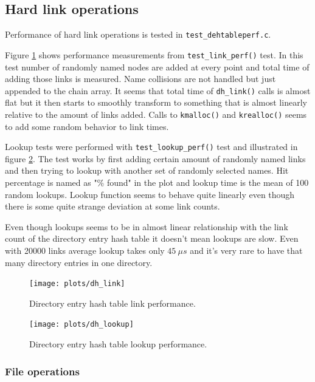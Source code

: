 \subsection{Hard link operations}

Performance of hard link operations is tested in \verb+test_dehtableperf.c+.

Figure \ref{figure:dhlink_perf} shows performance measurements from
\verb+test_link_perf()+ test. In this test number of randomly named nodes are
added at every point and total time of adding those links is measured.
Name collisions are not handled but just appended to the chain array.
It seems that total time of \verb+dh_link()+ calls is almost flat but
it then starts to smoothly transform to something that is almost linearly
relative to the amount of links added. Calls to \verb+kmalloc()+ and
\verb+krealloc()+ seems to add some random behavior to link times.

Lookup tests were performed with \verb+test_lookup_perf()+ test and illustrated
in figure \ref{figure:dhlookup_perf}. The test works by first adding certain
amount of randomly named links and then trying to lookup with another set of
randomly selected names. Hit percentage is named as "\% found" in the plot and
lookup time is the mean of 100 random lookups. Lookup function seems to behave
quite linearly even though there is some quite strange deviation at some link
counts.

Even though lookups seems to be in almost linear relationship with the link
count of the directory entry hash table it doesn't mean lookups are slow.
Even with 20000 links average lookup takes only $45\:\mu s$ and it's very
rare to have that many directory entries in one directory.

\begin{figure}
  \texttt{[image: plots/dh\_link]}
  \centering
  \caption{Directory entry hash table link performance.}
  \label{figure:dhlink_perf}
\end{figure}

\begin{figure}
  \texttt{[image: plots/dh\_lookup]}
  \centering
  \caption{Directory entry hash table lookup performance.}
  \label{figure:dhlookup_perf}
\end{figure}

\subsubsection{File operations}

